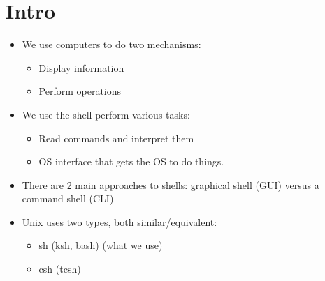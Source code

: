 \documentclass{article}
\author{Clement Tsang}
\begin{document}
\section{Intro}

\begin{itemize}
\item We use computers to do two mechanisms:
\begin{itemize}
	\item Display information
	\item Perform operations
\end{itemize}

\item We use the shell perform various tasks:
\begin{itemize}
	\item Read commands and interpret them
	\item OS interface that gets the OS to do things.
\end{itemize}

\item There are 2 main approaches to shells: graphical shell (GUI) versus a command shell (CLI)
\item Unix uses two types, both similar/equivalent:
\begin{itemize}
\item sh (ksh, bash) (what we use)
\item csh (tcsh)
\end{itemize}

\end{itemize}
\end{document}
